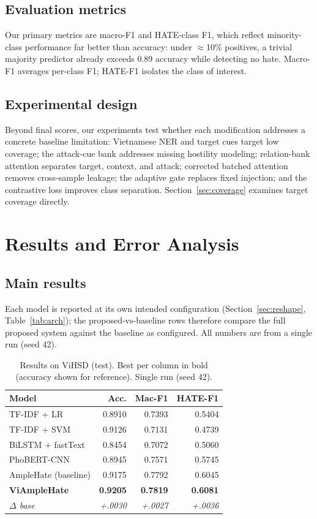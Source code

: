 \documentclass[11pt]{article}
\begin{document}
\subsection{Evaluation metrics}
Our primary metrics are macro-F1 and HATE-class F1, which reflect minority-class performance far better than accuracy: under $\approx$10\% positives, a trivial majority predictor already exceeds 0.89 accuracy while detecting no hate. Macro-F1 averages per-class F1; HATE-F1 isolates the class of interest.

\subsection{Experimental design}
Beyond final scores, our experiments test whether each modification addresses a concrete baseline limitation: Vietnamese NER and target cues target low coverage; the attack-cue bank addresses missing hostility modeling; relation-bank attention separates target, context, and attack; corrected batched attention removes cross-sample leakage; the adaptive gate replaces fixed injection; and the contrastive loss improves class separation. Section~\ref{sec:coverage} examines target coverage directly.

\section{Results and Error Analysis}

\subsection{Main results}

Each model is reported at its own intended configuration (Section~\ref{sec:reshape}, Table~\ref{tab:arch}); the proposed-vs-baseline rows therefore compare the full proposed system against the baseline as configured. All numbers are from a single run (seed 42).

\begin{table}[t]
  \centering
  \small
  \begin{tabular}{lrrr}
    \toprule
    \textbf{Model} & \textbf{Acc.} & \textbf{Mac-F1} & \textbf{HATE-F1} \\
    \midrule
    TF-IDF + LR          & 0.8910 & 0.7393 & 0.5404 \\
    TF-IDF + SVM         & 0.9126 & 0.7131 & 0.4739 \\
    BiLSTM + fastText    & 0.8454 & 0.7072 & 0.5060 \\
    PhoBERT-CNN          & 0.8945 & 0.7571 & 0.5745 \\
    AmpleHate (baseline) & 0.9175 & 0.7792 & 0.6045 \\
    \textbf{ViAmpleHate} & \textbf{0.9205} & \textbf{0.7819} & \textbf{0.6081} \\
    \textit{$\Delta$ base} & \textit{+.0030} & \textit{+.0027} & \textit{+.0036} \\
    \bottomrule
  \end{tabular}
  \caption{Results on ViHSD (test). Best per column in bold (accuracy shown for reference). Single run (seed 42).}
  \label{tab:vihsd}
\end{table}
\end{document}
